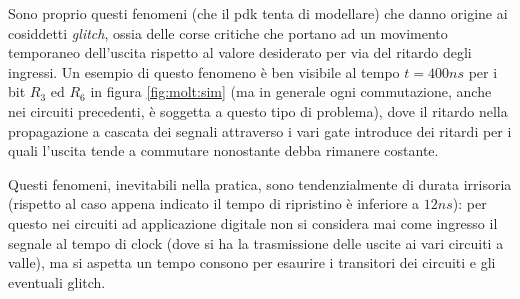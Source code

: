 	Sono proprio questi fenomeni (che il pdk tenta di modellare) che danno origine ai cosiddetti \textit{glitch}, ossia delle corse critiche che portano ad un movimento temporaneo dell'uscita rispetto al valore desiderato per via del ritardo degli ingressi. Un esempio di questo fenomeno è ben visibile al tempo $t=400ns$ per i bit $R_3$ ed $R_6$ in figura \ref{fig:molt:sim} (ma in generale ogni commutazione, anche nei circuiti precedenti, è soggetta a questo tipo di problema), dove il ritardo nella propagazione a cascata dei segnali attraverso i vari gate introduce dei ritardi per i quali l'uscita tende a commutare nonostante debba rimanere costante.
	
	Questi fenomeni, inevitabili nella pratica, sono tendenzialmente di durata irrisoria (rispetto al caso appena indicato il tempo di ripristino è inferiore a $12ns$): per questo nei circuiti ad applicazione digitale non si considera mai come ingresso il segnale al tempo di clock (dove si ha la trasmissione delle uscite ai vari circuiti a valle), ma si aspetta un tempo consono per esaurire i transitori dei circuiti e gli eventuali glitch.
	
	
	
	